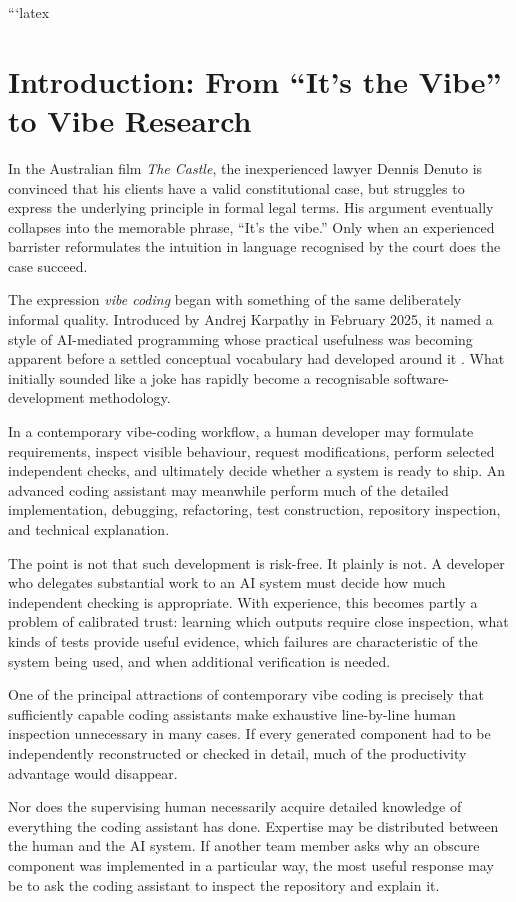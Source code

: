 ```latex
\section{Introduction: From ``It's the Vibe'' to Vibe Research}

In the Australian film \emph{The Castle}, the inexperienced lawyer Dennis Denuto is convinced that his clients have a valid constitutional case, but struggles to express the underlying principle in formal legal terms. His argument eventually collapses into the memorable phrase, ``It's the vibe.'' Only when an experienced barrister reformulates the intuition in language recognised by the court does the case succeed.

The expression \emph{vibe coding} began with something of the same deliberately informal quality. Introduced by Andrej Karpathy in February 2025, it named a style of AI-mediated programming whose practical usefulness was becoming apparent before a settled conceptual vocabulary had developed around it \citep{fowler2026vibecoding}. What initially sounded like a joke has rapidly become a recognisable software-development methodology.

In a contemporary vibe-coding workflow, a human developer may formulate requirements, inspect visible behaviour, request modifications, perform selected independent checks, and ultimately decide whether a system is ready to ship. An advanced coding assistant may meanwhile perform much of the detailed implementation, debugging, refactoring, test construction, repository inspection, and technical explanation.

The point is not that such development is risk-free. It plainly is not. A developer who delegates substantial work to an AI system must decide how much independent checking is appropriate. With experience, this becomes partly a problem of calibrated trust: learning which outputs require close inspection, what kinds of tests provide useful evidence, which failures are characteristic of the system being used, and when additional verification is needed.

One of the principal attractions of contemporary vibe coding is precisely that sufficiently capable coding assistants make exhaustive line-by-line human inspection unnecessary in many cases. If every generated component had to be independently reconstructed or checked in detail, much of the productivity advantage would disappear.

Nor does the supervising human necessarily acquire detailed knowledge of everything the coding assistant has done. Expertise may be distributed between the human and the AI system. If another team member asks why an obscure component was implemented in a particular way, the most useful response may be to ask the coding assistant to inspect the repository and explain it.

